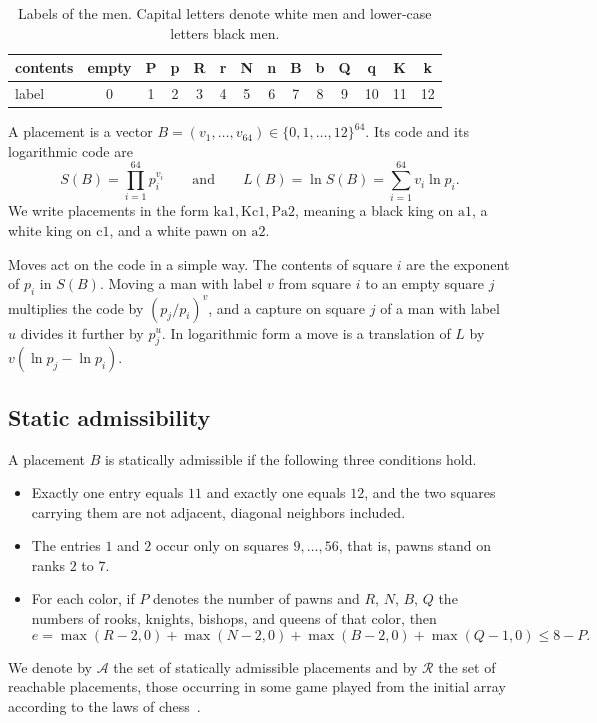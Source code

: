 \documentclass[12pt,reqno]{article}
\newcommand{\adm}{\mathcal{A}}
\newcommand{\rea}{\mathcal{R}}
\newcommand{\sq}[1]{\mathrm{#1}}
\begin{document}
\begin{table}[H]
\begin{center}
\begin{tabular}{l|ccccccccccccc}
contents & empty & P & p & R & r & N & n & B & b & Q & q & K & k\\ \hline
label & 0 & 1 & 2 & 3 & 4 & 5 & 6 & 7 & 8 & 9 & 10 & 11 & 12
\end{tabular}
\end{center}
\caption{Labels of the men. Capital letters denote white men and lower-case letters black men.}
\label{tablabels}
\end{table}

A placement is a vector $B=(v_1,\ldots,v_{64})\in\{0,1,\ldots,12\}^{64}$. Its code
and its logarithmic code are
\begin{equation}\label{eqcode}
S(B)=\prod_{i=1}^{64}p_i^{v_i}
\qquad\text{and}\qquad
L(B)=\ln S(B)=\sum_{i=1}^{64}v_i\ln p_i .
\end{equation}
We write placements in the form $\sq{ka1},\sq{Kc1},\sq{Pa2}$, meaning a black king on
$\sq{a1}$, a white king on $\sq{c1}$, and a white pawn on $\sq{a2}$.

\begin{remark}
Moves act on the code in a simple way. The contents of square $i$ are
the exponent of $p_i$ in $S(B)$. Moving a man with label $v$ from square $i$ to an empty
square $j$ multiplies the code by $(p_j/p_i)^v$, and a capture on square $j$ of a man with
label $u$ divides it further by $p_j^u$. In logarithmic form a move is a translation of $L$ by
$v(\ln p_j-\ln p_i)$.
\end{remark}

\subsection{Static admissibility}

\begin{definition}\label{defadm}
A placement $B$ is statically admissible if the following three conditions hold.
\begin{itemize}
\item[(S1)] Exactly one entry equals $11$ and exactly one equals $12$, and the two squares carrying
them are not adjacent, diagonal neighbors included.
\item[(S2)] The entries $1$ and $2$ occur only on squares $9,\ldots,56$, that is, pawns stand on ranks
$2$ to $7$.
\item[(S3)] For each color, if $P$ denotes the number of pawns and $R$, $N$, $B$, $Q$ the numbers
of rooks, knights, bishops, and queens of that color, then
\begin{equation}\label{eqexcess}
e=\max(R-2,0)+\max(N-2,0)+\max(B-2,0)+\max(Q-1,0)\leq 8-P .
\end{equation}
\end{itemize}
We denote by $\adm$ the set of statically admissible placements and by $\rea$ the set of
reachable placements, those occurring in some game played from the initial array
according to the laws of chess~\cite{fide}.
\end{definition}
\end{document}
